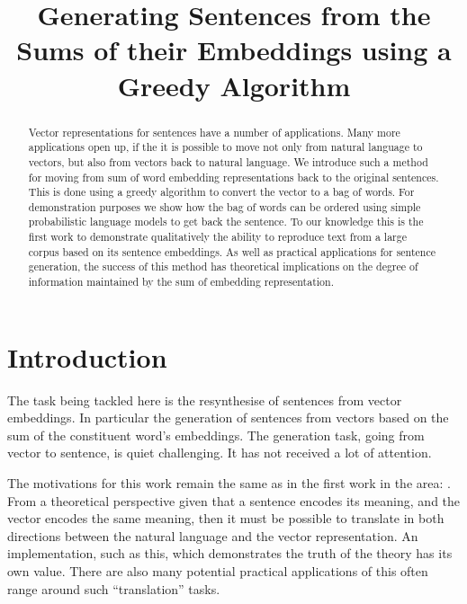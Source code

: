 \documentclass[11pt]{article}
\title{Generating Sentences from the Sums of their Embeddings using a Greedy Algorithm}
\author{}
\numberwithin{equation}{section}
\numberwithin{figure}{section}
\theoremstyle{plain}
\theoremstyle{definition}
\begin{document}
\maketitle

\begin{abstract}
Vector representations for sentences have a number of applications.
Many more applications open up, if the it is possible to move not only from natural language to vectors, but also from vectors back to natural language. We introduce such a method for moving from sum of word embedding representations back to the original sentences. This is done using a greedy algorithm to convert the vector to a bag of words. For demonstration purposes we show how the bag of words can be ordered using simple probabilistic language models to get back the sentence. To our knowledge this is the first work to demonstrate qualitatively the ability to reproduce text from a large corpus based on its sentence embeddings. 
As well as practical applications for sentence generation, the success of this method has theoretical implications on the degree of information maintained by the sum of embedding representation.

\end{abstract}

\section{Introduction} \label{intro}


The task being tackled here is the resynthesise of sentences from vector embeddings. In particular the generation of sentences from vectors based on the sum of the constituent word's embeddings. The generation task, going from vector to sentence, is quiet challenging. It has not received a lot of attention.

The motivations for this work remain the same as in the first work in the area: \textcite{Dinu2014CompositionalGeneration}. From a theoretical perspective given that a sentence encodes its meaning, and the vector encodes the same meaning, then it must be possible to translate in both directions between the natural language and the vector representation. An implementation, such as this, which demonstrates the truth of the theory has its own value. There are also many potential practical applications of this often range around such ``translation'' tasks.
\end{document}
